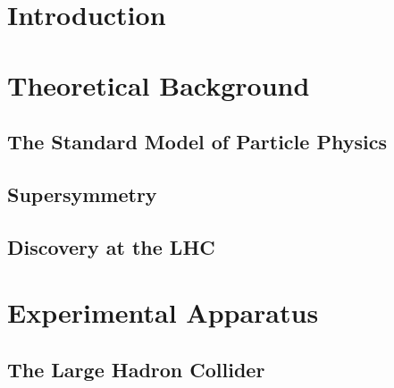 \documentclass{outhesis}
\begin{document}
\mainmatter

\chapter{Introduction}\label{chap:intro}
\graphicspath{{figures/intro/}}


\chapter{Theoretical Background}\label{chap:theory}
\graphicspath{{figures/theory/}}

\section{The Standard Model of Particle Physics}\label{sec:theory.sm}

\section{Supersymmetry}\label{sec:theory.susy}

%
\section{Discovery at the LHC}\label{sec:theory.disc}


\chapter{Experimental Apparatus}\label{chap:exp}
\graphicspath{{figures/exp/}}
\section{The Large Hadron Collider}\label{sec:exp.lhc}

\end{document}
